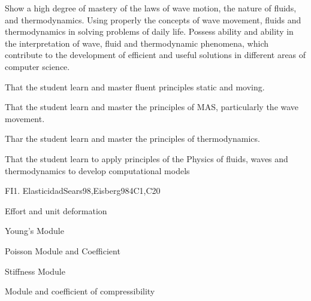 \begin{syllabus}


\begin{justification}
Show a high degree of mastery of the laws of wave motion, the nature of fluids, and thermodynamics. Using properly the concepts of wave movement, fluids and thermodynamics in solving problems of daily life. Possess ability and ability in the interpretation of wave, fluid and thermodynamic phenomena, which contribute to the development of efficient and useful solutions in different areas of computer science.
\end{justification}

\begin{goals}
\item  That the student learn and master fluent principles static and moving.
\item  That the student learn and master the principles of MAS, particularly the wave movement.
\item  Thar the student learn and master the principles of thermodynamics.
\item  That the student learn to apply principles of the Physics of fluids, waves and thermodynamics to develop computational models
\end{goals}

\begin{outcomes}
  \item {}
  \item {}
  \item {}
\end{outcomes}

\begin{competences}
    \item {}
    \item {}
\end{competences}

\begin{unit}{FI1. Elasticidad}{}{Sears98,Eisberg98}{4}{C1,C20}
\begin{topics}
         \item  Effort and unit deformation
	 \item  Young's Module
         \item  Poisson Module and Coefficient
	 \item  Stiffness Module
         \item  Module and coefficient of compressibility
   \end{topics}


\end{unit}
\end{syllabus}
